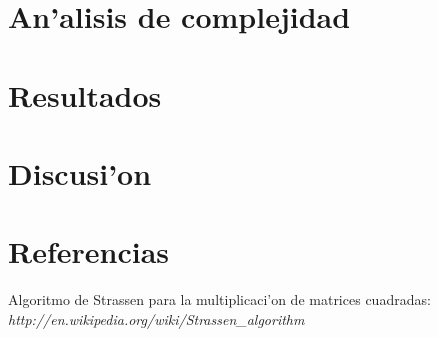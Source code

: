 \documentclass[spanish, a4paper, 11pt]{article}
\begin{document}
\clearpage
\section{An'alisis de complejidad}


\clearpage
\section{Resultados}


\clearpage
\section{Discusi'on}







\clearpage
\section{Referencias}
\begin{thebibliography}{99}

	 Algoritmo de Strassen para la multiplicaci'on de matrices cuadradas:\\  {\it http://en.wikipedia.org/wiki/Strassen\_algorithm}

\end{thebibliography}
\end{document}
